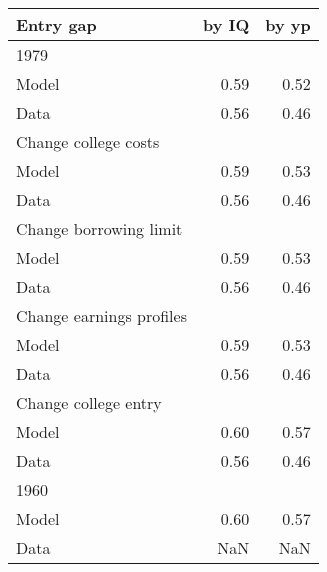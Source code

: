 \begin{tabular}{lrr}
\hline
Entry gap & by IQ  & by yp  \\ 
\hline
1979 &   &   \\ 
Model & 0.59  & 0.52  \\ 
Data & 0.56  & 0.46  \\ 
Change college costs &   &   \\ 
Model & 0.59  & 0.53  \\ 
Data & 0.56  & 0.46  \\ 
Change borrowing limit &   &   \\ 
Model & 0.59  & 0.53  \\ 
Data & 0.56  & 0.46  \\ 
Change earnings profiles &   &   \\ 
Model & 0.59  & 0.53  \\ 
Data & 0.56  & 0.46  \\ 
Change college entry &   &   \\ 
Model & 0.60  & 0.57  \\ 
Data & 0.56  & 0.46  \\ 
1960 &   &   \\ 
Model & 0.60  & 0.57  \\ 
Data & NaN  & NaN  \\ 
\hline
\end{tabular}%

